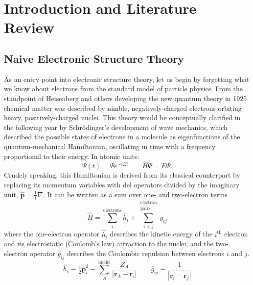 \chapter[%
    Introduction and Literature Review
]{%
    Introduction and Literature Review
}

\section{Naive Electronic Structure Theory}
\label{sec:introduction:naive-electronic-structure}

As an entry point into electronic structure theory, let us begin by forgetting
what we know about electrons from the standard model of particle physics.
From the standpoint of Heisenberg and others developing the new quantum theory
in 1925\cite{Heisenberg:1925p879} chemical matter was described by nimble,
negatively-charged electrons orbiting heavy, positively-charged nuclei.
This theory would be conceptually clarified in the following year by
Schr\"odinger's development of wave mechanics,
\cite{Schrodinger:1926p361,Schrodinger:1926p489,Schrodinger:1926p734} which
described the possible states of electrons in a molecule as eigenfunctions of
the quantum-mechanical Hamiltonian, oscillating in time with a frequency
proportional to their energy.
In atomic units:
\begin{equation}
    \Psi(t)
    =
    \Psi
    e^{-iEt}
    \qquad
    \hat{H}
    \Psi
    =
    E
    \Psi.
\end{equation}
Crudely speaking, this Hamiltonian is derived from its classical counterpart by
replacing its momentum variables with del operators divided by the imaginary
unit,
\(
    \hat{\mathbf{p}}
    =
    \frac{1}{i}
    \nabla
\).
It can be written as a sum over one- and two-electron terms
\begin{equation}
    \hat{H}
    =
    \sum_i^\text{electrons}
    \hat{h}_i
    +
    \sum_{i<j}^{\substack{\text{electron}\\\text{pairs}}}
    \hat{g}_{ij}
\end{equation}
where the one-electron operator
\(
    \hat{h}_i
\)
describes the kinetic energy of the \(i^\text{th}\) electron and its
electrostatic (Coulomb's law) attraction to the nuclei, and the two-electron
operator
\(
    \hat{g}_{ij}
\)
describes the Coulombic repulsion between electrons \(i\) and \(j\).
\begin{equation}
    \hat{h}_i
    \equiv
    \tfrac{1}{2}
    \hat{\mathbf{p}}_i^2
    -
    \sum_A^\text{nuclei}
    \frac{Z_A}{|\mathbf{r}_A - \mathbf{r}_i|}
    \qquad
    \hat{g}_{ij}
    \equiv
    \frac{1}{|\mathbf{r}_i - \mathbf{r}_j|}
\end{equation}
